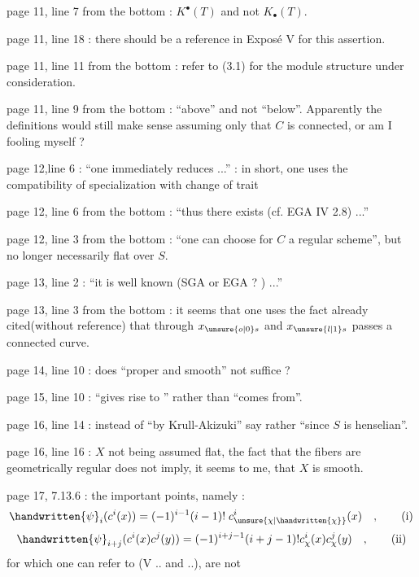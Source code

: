 
page 11, line 7 from the bottom : $K^{\bullet}(T)$ and not $K_{\bullet}(T)$.

page 11, line 18 : there should be a reference in Exposé V for this assertion.

page 11, line 11 from the bottom : refer to (3.1) for the module structure under consideration.

page 11, line 9 from the bottom : ``above'' and not ``below''. Apparently the definitions would still make sense assuming only that $C$ is connected, or am I fooling myself ?

page 12,line 6 : ``one immediately reduces ...'' : in short, one uses the compatibility of specialization with change of trait

page 12, line 6 from the bottom : ``thus there exists (cf. EGA IV 2.8) ...''

page 12, line 3 from the bottom : ``one can choose for $C$ a regular scheme'', but no longer necessarily flat over $S$.

page 13, line 2 : ``it is well known (SGA or EGA ? ) ...''


page 13, line 3 from the bottom : it seems that one uses the fact already cited(without reference) that through $x_{\unsure{o|0}s}$ and $x_{\unsure{l|1}s}$ passes a connected curve.

page 14, line 10 : does ``proper and smooth'' not suffice ?

page 15, line 10 : ``gives rise to '' rather than ``comes from''.

page 16, line 14 : instead of ``by Krull-Akizuki'' say rather ``since $S$ is henselian''.

page 16, line 16 : $X$ not being assumed flat, the fact that the fibers are geometrically regular does not imply, it seems to me, that $X$ is smooth.


page 17, 7.13.6 : the important points, namely :
\begingroup
\makeatletter\tagsleft@true\makeatother
\[
\handwritten{\psi}_i(c^i(x)) = (-1)^{i-1}(i-1)!\;c^i_{\unsure{\chi|\handwritten{\chi}}}(x)\quad,\tag*{(i)}
\]
\[
\handwritten{\psi}_{i+j}(c^i(x)c^j(y)) = (-1)^{i+j-1}(i+j-1)!c^i_{\chi}(x)c^j_{\chi}(y)\quad,\tag*{(ii)}
\]
\endgroup
for which one can refer to (V .. and ..), are not
\clearpage
